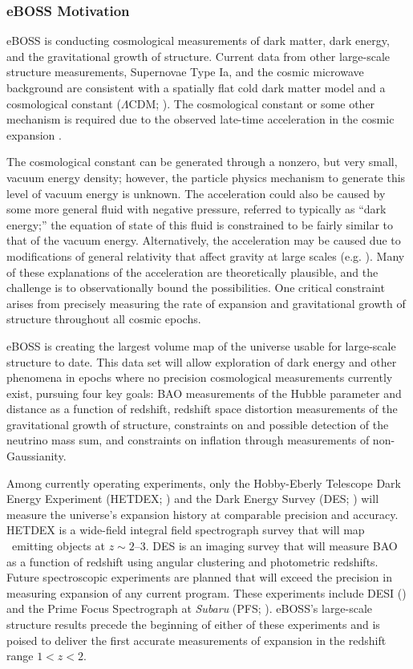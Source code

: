 \subsubsection{eBOSS Motivation}
\label{sec:eboss:motivation}

eBOSS is conducting cosmological measurements of dark matter, dark
energy, and the gravitational growth of structure.  Current data from
other large-scale structure measurements, Supernovae Type Ia, and the
cosmic microwave background are consistent with a spatially flat cold
dark matter model and a cosmological constant
($\Lambda$CDM; \citealt{weinberg13a, aubourg15a}). The cosmological
constant or some other mechanism is required due to the observed
late-time acceleration in the cosmic
expansion \citep[e.g.,][]{riess98, perlmutter99a}.

The cosmological constant can be generated through a nonzero, but very
small, vacuum energy density; however, the particle physics mechanism
to generate this level of vacuum energy is unknown. The acceleration
could also be caused by some more general fluid with negative
pressure, referred to typically as ``dark energy;'' the equation of
state of this fluid is constrained to be fairly similar to that of the
vacuum energy. Alternatively, the acceleration may be caused due to
modifications of general relativity that affect gravity at large
scales (e.g. \citealt{randall99a, dvali00a, sahni03a, sotiriou10a,
battye12a}). Many of these explanations of the acceleration are
theoretically plausible, and the challenge is to observationally bound
the possibilities. One critical constraint arises from precisely
measuring the rate of expansion and gravitational growth of structure
throughout all cosmic epochs.

eBOSS is creating the largest volume map of the universe usable for
large-scale structure to date. This data set will allow exploration of
dark energy and other phenomena in epochs where no precision
cosmological measurements currently exist, pursuing four key goals:
BAO measurements of the Hubble parameter and distance as a function of
redshift, redshift space distortion measurements of the gravitational
growth of structure, constraints on and possible detection of the
neutrino mass sum, and constraints on inflation through measurements
of non-Gaussianity.

Among currently operating experiments, only the Hobby-Eberly Telescope
Dark Energy Experiment (HETDEX; \citealt{hill08a}) and the Dark Energy
Survey (DES; \citealt{abbott16a}) will measure the universe's
expansion history at comparable precision and accuracy. HETDEX is a
wide-field integral field spectrograph survey that will map \lya\
emitting objects at $z\sim 2$--$3$. DES is an imaging survey that will
measure BAO as a function of redshift using angular clustering and
photometric redshifts.  Future spectroscopic experiments are planned
that will exceed the precision in measuring expansion of any current
program. These experiments include DESI (\citealt{levi13a}) and the
Prime Focus Spectrograph at {\it Subaru} (PFS; \citealt{takada14a}). eBOSS's
large-scale structure results precede the beginning of either of these
experiments and is poised to deliver the first accurate measurements
of expansion in the redshift range $1<z<2$.

